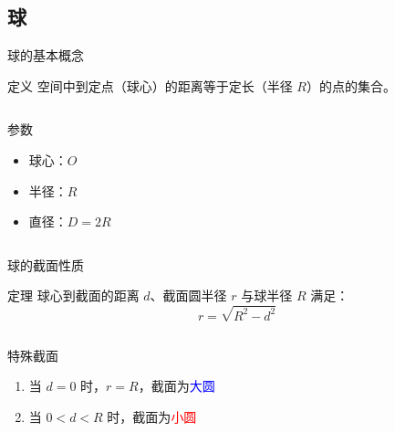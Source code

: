 
\subsection{球}
\begin{frame}{球的基本概念}
    \begin{block}{定义}
        空间中到定点（球心）的距离等于定长（半径 \(R\)）的点的集合。
    \end{block}
    
    \begin{columns}
        \begin{exampleblock}{参数}
            \begin{itemize}
                \item 球心：\(O\)
                \item 半径：\(R\)
                \item 直径：\(D = 2R\)
            \end{itemize}
        \end{exampleblock}
        
        
    \end{columns}
  \end{frame}
  
  \begin{frame}{球的截面性质}
    \begin{block}{定理}
        球心到截面的距离 \(d\)、截面圆半径 \(r\) 与球半径 \(R\) 满足：
        \[
        r = \sqrt{R^2 - d^2}
        \]
    \end{block} 
    
    \begin{columns}
        \begin{exampleblock}{特殊截面}
            \begin{enumerate}
                \item 当 \(d = 0\) 时，\(r = R\)，截面为\textcolor{blue}{大圆}
                \item 当 \(0 < d < R\) 时，截面为\textcolor{red}{小圆}
            \end{enumerate}
        \end{exampleblock}
        
        
    \end{columns}
  \end{frame}
  

